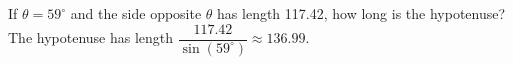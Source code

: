 {If $\theta = 59^{\circ}$ and the side opposite $\theta$ has length 117.42, how long is the hypotenuse?}
{The hypotenuse has length $\dfrac{117.42}{\sin(59^{\circ})}\approx 136.99$.}
